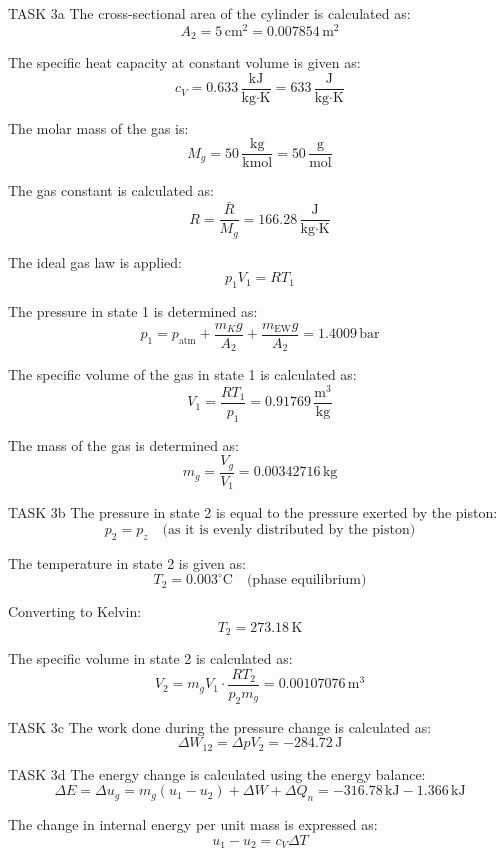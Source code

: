 TASK 3a  
The cross-sectional area of the cylinder is calculated as:  
\[
A_2 = 5 \, \text{cm}^2 = 0.007854 \, \text{m}^2
\]  

The specific heat capacity at constant volume is given as:  
\[
c_V = 0.633 \, \frac{\text{kJ}}{\text{kg·K}} = 633 \, \frac{\text{J}}{\text{kg·K}}
\]  

The molar mass of the gas is:  
\[
M_g = 50 \, \frac{\text{kg}}{\text{kmol}} = 50 \, \frac{\text{g}}{\text{mol}}
\]  

The gas constant is calculated as:  
\[
R = \frac{\bar{R}}{M_g} = 166.28 \, \frac{\text{J}}{\text{kg·K}}
\]  

The ideal gas law is applied:  
\[
p_1 V_1 = R T_1
\]  

The pressure in state 1 is determined as:  
\[
p_1 = p_{\text{atm}} + \frac{m_K g}{A_2} + \frac{m_{\text{EW}} g}{A_2} = 1.4009 \, \text{bar}
\]  

The specific volume of the gas in state 1 is calculated as:  
\[
V_1 = \frac{R T_1}{p_1} = 0.91769 \, \frac{\text{m}^3}{\text{kg}}
\]  

The mass of the gas is determined as:  
\[
m_g = \frac{V_g}{V_1} = 0.00342716 \, \text{kg}
\]  

TASK 3b  
The pressure in state 2 is equal to the pressure exerted by the piston:  
\[
p_2 = p_z \quad \text{(as it is evenly distributed by the piston)}
\]  

The temperature in state 2 is given as:  
\[
T_2 = 0.003^\circ\text{C} \quad \text{(phase equilibrium)}
\]  

Converting to Kelvin:  
\[
T_2 = 273.18 \, \text{K}
\]  

The specific volume in state 2 is calculated as:  
\[
V_2 = m_g V_1 \cdot \frac{R T_2}{p_2 m_g} = 0.00107076 \, \text{m}^3
\]  

TASK 3c  
The work done during the pressure change is calculated as:  
\[
\Delta W_{12} = \Delta p V_2 = -284.72 \, \text{J}
\]  

TASK 3d  
The energy change is calculated using the energy balance:  
\[
\Delta E = \Delta u_g = m_g (u_1 - u_2) + \Delta W + \Delta Q_n = -316.78 \, \text{kJ} - 1.366 \, \text{kJ}
\]  

The change in internal energy per unit mass is expressed as:  
\[
u_1 - u_2 = c_V \Delta T
\]